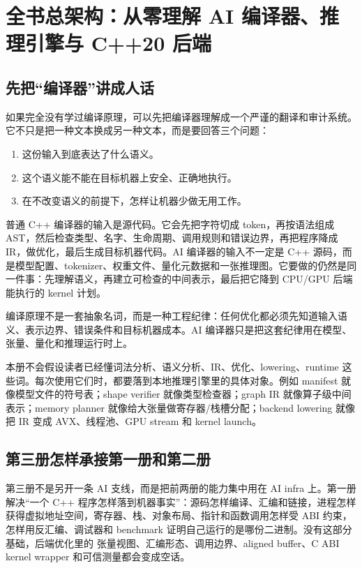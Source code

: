 \section{全书总架构：从零理解 AI 编译器、推理引擎与 C++20 后端}

\subsection{先把“编译器”讲成人话}

如果完全没有学过编译原理，可以先把编译器理解成一个严谨的翻译和审计系统。它不只是把一种文本换成另一种文本，而是要回答三个问题：

\begin{enumerate}
  \item 这份输入到底表达了什么语义。
  \item 这个语义能不能在目标机器上安全、正确地执行。
  \item 在不改变语义的前提下，怎样让机器少做无用工作。
\end{enumerate}

普通 C++ 编译器的输入是源代码。它会先把字符切成 token，再按语法组成 AST，然后检查类型、名字、生命周期、调用规则和错误边界，再把程序降成 IR，做优化，最后生成目标机器代码。AI 编译器的输入不一定是 C++ 源码，而是模型配置、tokenizer、权重文件、量化元数据和一张推理图。它要做的仍然是同一件事：先理解语义，再建立可检查的中间表示，最后把它降到 CPU/GPU 后端能执行的 kernel 计划。

\begin{keyidea}
编译原理不是一套抽象名词，而是一种工程纪律：任何优化都必须先知道输入语义、表示边界、错误条件和目标机器成本。AI 编译器只是把这套纪律用在模型、张量、量化和推理运行时上。
\end{keyidea}

本册不会假设读者已经懂词法分析、语义分析、IR、优化、lowering、runtime 这些词。每次使用它们时，都要落到本地推理引擎里的具体对象。例如 manifest 就像模型文件的符号表；shape verifier 就像类型检查器；graph IR 就像算子级中间表示；memory planner 就像给大张量做寄存器/栈槽分配；backend lowering 就像把 IR 变成 AVX、线程池、GPU stream 和 kernel launch。

\subsection{第三册怎样承接第一册和第二册}

第三册不是另开一条 AI 支线，而是把前两册的能力集中用在 AI infra 上。第一册解决“一个 C++ 程序怎样落到机器事实”：源码怎样编译、汇编和链接，进程怎样获得虚拟地址空间，寄存器、栈、对象布局、指针和函数调用怎样受 ABI 约束，怎样用反汇编、调试器和 benchmark 证明自己运行的是哪份二进制。没有这部分基础，后端优化里的  张量视图、汇编形态、调用边界、aligned buffer、C ABI kernel wrapper 和可信测量都会变成空话。

